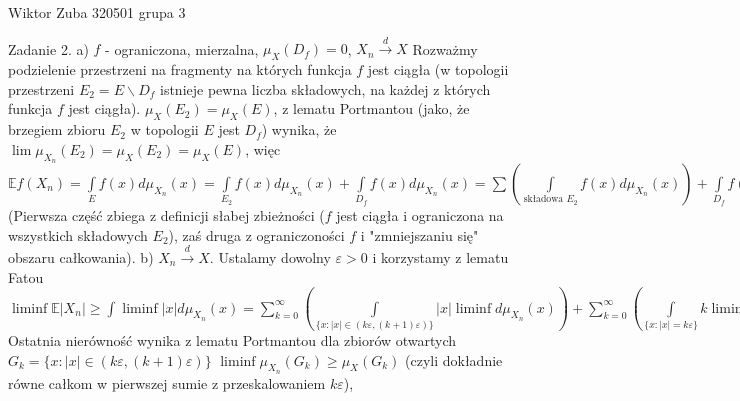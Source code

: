 \documentclass{article}
\begin{document}
Wiktor Zuba 320501 grupa 3
\newline

Zadanie 2.
\newline
a) $f$ - ograniczona, mierzalna, $\mu_X(D_f)=0$, $X_n\xrightarrow{d} X$\newline
Rozważmy podzielenie przestrzeni na fragmenty na których funkcja $f$ jest ciągła
(w topologii przestrzeni $E_2=E\backslash D_f$ istnieje pewna liczba składowych, na każdej z których funkcja $f$ jest ciągła).\newline
$\mu_X(E_2)=\mu_X(E)$, z lematu Portmantou (jako, że brzegiem zbioru $E_2$ w topologii $E$ jest $D_f$) wynika, że $\lim\mu_{X_n}(E_2)=\mu_X(E_2)=\mu_X(E)$, więc
$\mathbb{E}f(X_n)=\int\limits_{E}f(x)d\mu_{X_n}(x)=\int\limits_{E_2}f(x)d\mu_{X_n}(x)+\int\limits_{D_f}f(x)d\mu_{X_n}(x)=
\sum\left(\int\limits_{\text{składowa }E_2}f(x)d\mu_{X_n}(x)\right)+\int\limits_{D_f}f(x)d\mu_{X_n}(x)\rightarrow
\sum\left(\int\limits_{\text{składowa }E_2}f(x)d\mu_{X}(x)\right)+0=
\int\limits_{E_2}f(x)d\mu_{X}(x)+0=\int\limits_{E}f(x)d\mu_{X}(x)\mathbb{E}f(X)$
(Pierwsza część zbiega z definicji słabej zbieżności ($f$ jest ciągła i ograniczona na wszystkich składowych $E_2$), zaś druga z ograniczoności $f$ i "zmniejszaniu się" obszaru całkowania).\newline\newline
b) $X_n\xrightarrow{d} X$. Ustalamy dowolny $\varepsilon>0$ i korzystamy z lematu Fatou\newline
$\liminf\mathbb{E}|X_n|\ge\int\liminf|x|d\mu_{X_n}(x)=
\sum\limits_{k=0}^{\infty}\left(\int\limits_{\{x:|x|\in(k\varepsilon,(k+1)\varepsilon)\}}|x|\liminf d\mu_{X_n}(x)\right)
+\sum\limits_{k=0}^{\infty}\left(\int\limits_{\{x:|x|=k\varepsilon\}}k\liminf d\mu_{X_n}(x)\right)\ge
\sum\limits_{k=0}^{\infty}\left(\int\limits_{\{x:|x|\in(k\varepsilon,(k+1)\varepsilon)\}}k\liminf d\mu_{X_n}(x)\right)
+\sum\limits_{k=0}^{\infty}\left(\int\limits_{\{x:|x|=k\varepsilon\}}k\varepsilon\liminf d\mu_{X_n}(x)\right)=
\sum\limits_{k=0}^{\infty}\left(\int\limits_{\{x:|x|\in(k\varepsilon,(k+1)\varepsilon)\}}k\varepsilon\liminf d\mu_{X_n}(x)\right)
+\sum\limits_{k=0}^{\infty}\left(\int\limits_{\{x:|x|=k\varepsilon\}}k\varepsilon d\mu_{X}(x)\right)\ge
\sum\limits_{k=0}^{\infty}\left(\int\limits_{\{x:|x|\in(k\varepsilon,(k+1)\varepsilon)\}}k\varepsilon d\mu_{X}(x)\right)
+\sum\limits_{k=0}^{\infty}\left(\int\limits_{\{x:|x|=k\varepsilon\}}k\varepsilon d\mu_{X}(x)\right)$ Ostatnia nierówność wynika z lematu Portmantou dla zbiorów otwartych
$G_k={\{x:|x|\in(k\varepsilon,(k+1)\varepsilon)\}}$ $\liminf\mu_{X_n}(G_k)\ge\mu_X(G_k)$ (czyli dokładnie równe całkom w pierwszej sumie z przeskalowaniem $k\varepsilon$),
\end{document}
